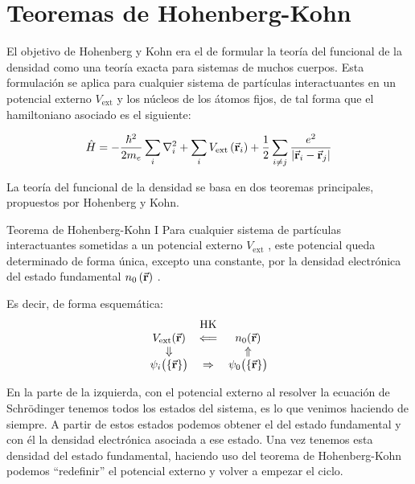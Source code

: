 \section{Teoremas de Hohenberg-Kohn}

El objetivo de Hohenberg y Kohn era el de formular la teoría del funcional de la densidad como una teoría exacta para sistemas de muchos cuerpos. Esta formulación se aplica para cualquier sistema de partículas interactuantes en un potencial externo $V_{\text{ext}}$ y los núcleos de los átomos fijos, de tal forma que el hamiltoniano asociado es el siguiente:

\begin{equation}
    \hat{H} = - \frac{\hbar^2}{2 m_{e}} \sum_i \nabla_{i}^2 + \sum_i V_{\text{ext}}  \left( \va{r}_i  \right)  + \frac{1}{2} \sum_{i \neq j} \frac{e^2}{\abs{ \va{r}_i - \va{r}_j} }
\end{equation}

La teoría del funcional de la densidad se basa en dos teoremas principales, propuestos por Hohenberg y Kohn.

\begin{mytheo}{Teorema de Hohenberg-Kohn I}{}
    Para cualquier sistema de partículas interactuantes sometidas a un potencial externo $V_{\text{ext}}$ , este potencial queda determinado de forma única, excepto una constante, por la densidad electrónica del estado fundamental $n_0 \left( \va{r} \right)$ .
\end{mytheo}

Es decir, de forma esquemática: \begin{equation}
  \begin{array}{ccc}
     & \text{HK} & \\
     V_{\text{ext}}(\va{r}) 
       & \Longleftarrow 
       & n_0(\va{r}) \\
     \Downarrow 
       & 
       & \Uparrow \\
     \psi_i\bigl(\{\va{r}\}\bigr) 
       & \Rightarrow 
       & \psi_0\bigl(\{\va{r}\}\bigr)
  \end{array}
  \end{equation}
  
  En la parte de la izquierda, con el potencial externo al resolver la ecuación de Schrödinger tenemos todos los estados del sistema, es lo que venimos haciendo de siempre. A partir de estos estados podemos obtener el del estado fundamental y con él la densidad electrónica asociada a ese estado. Una vez tenemos esta densidad del estado fundamental, haciendo uso del teorema de Hohenberg-Kohn podemos ``redefinir'' el potencial externo y volver a empezar el ciclo.

